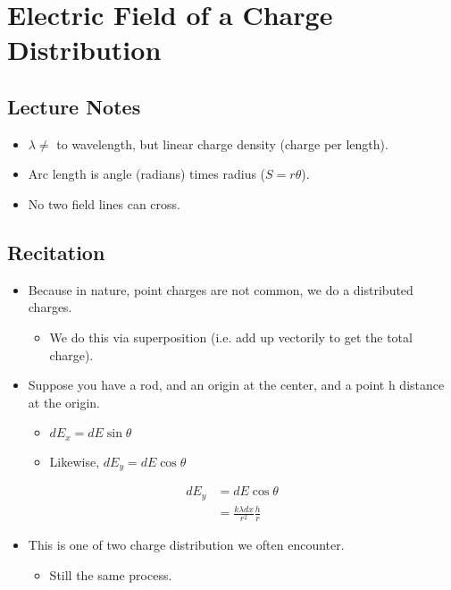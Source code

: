 \documentclass[11pt]{article}
\newcommand{\chapterTitle}{Electric Field of a Charge Distribution}
\begin{document}
\section{\chapterTitle}

\subsection{Lecture Notes}
\begin{itemize}
    \item $\lambda \neq$ to wavelength, but linear charge density (charge per length).
    \item Arc length is angle (radians) times radius ($S = r\theta$).
    \item No two field lines can cross.
\end{itemize}

\subsection{Recitation}
\begin{itemize}
    \item Because in nature, point charges are not common, we do a distributed charges.
    \begin{itemize}
        \item We do this via superposition (i.e. add up vectorily to get the total charge).
    \end{itemize}
    \item Suppose you have a rod, and an origin at the center, and a point h distance at the origin.
    \begin{itemize}
        \item $dE_x = dE \sin \theta$
        \item Likewise, $dE_y = dE \cos \theta$
    \end{itemize}
\end{itemize}

\begin{align}
    dE_y & = dE \cos \theta \\
    & = \frac{k \lambda dx}{r^2} \frac{h}{r}
\end{align}

\begin{itemize}
    \item This is one of two charge distribution we often encounter.
    \begin{itemize}
        \item Still the same process.
    \end{itemize}
\end{itemize}
\end{document}
